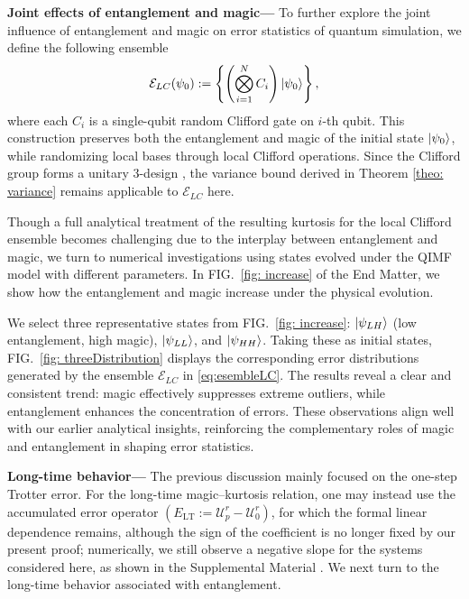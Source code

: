 \documentclass[showpacs,amsmath,amssymb,twocolumn,aps,pra,superscriptaddress,notitlepage,10pt]{revtex4-2}
\newcommand{\sU}{\mathscr U}
\begin{document}
\vspace{0.2cm}
\noindent\textbf{Joint effects of entanglement and magic---} To further explore the joint influence of entanglement and magic on error statistics of quantum simulation, we define the following ensemble
\begin{equation}\label{eq:esembleLC}
    \mathcal E_{LC}(\psi_0):=\left\{\left(\bigotimes_{i=1}^N C_i\right)\ket{\psi_0}\right\},
\end{equation}
where each $C_i$ is a single-qubit random Clifford gate on $i$-th qubit. This construction preserves both the entanglement and magic of the initial state $\ket{\psi_0}$, while randomizing local bases through local Clifford operations. Since the Clifford group forms a unitary 3-design \cite{webb2015clifford,zhu2016clifford,bittel2025completetheorycliffordcommutant}, the variance bound derived in Theorem \ref{theo: variance} remains applicable to $\mathcal E_{LC}$ here.

Though a full analytical treatment of the resulting kurtosis for the local Clifford ensemble becomes challenging due to the interplay between entanglement and magic, we turn to numerical investigations using states evolved under the QIMF model with different parameters. In FIG.~\ref{fig: increase} of the End Matter, we show how the entanglement and magic increase under the physical evolution.

We select three representative states from FIG.~\ref{fig: increase}: $\ket{\psi_{LH}}$ (low entanglement, high magic), $\ket{\psi_{LL}}$, and $\ket{\psi_{HH}}$. Taking these as initial states, FIG.~\ref{fig: threeDistribution} displays the corresponding error distributions generated by the ensemble $\mathcal E_{LC}$ in \cref{eq:esembleLC}. The results reveal a clear and consistent trend: magic effectively suppresses extreme outliers, while entanglement enhances the concentration of errors. These observations align well with our earlier analytical insights, reinforcing the complementary roles of magic and entanglement in shaping error statistics.

\vspace{0.2cm}
\noindent\textbf{Long-time behavior---}
The previous discussion mainly focused on the one-step Trotter error. For the long-time magic--kurtosis relation, one may instead use the accumulated error operator $(E_{\mathrm{LT}}:=\sU_p^r-\sU_0^r)$, for which the formal linear dependence remains, although the sign of the coefficient is no longer fixed by our present proof; numerically, we still observe a negative slope for the systems considered here, as shown in the Supplemental Material \cite{seesm}. We next turn to the long-time behavior associated with entanglement.
\end{document}
